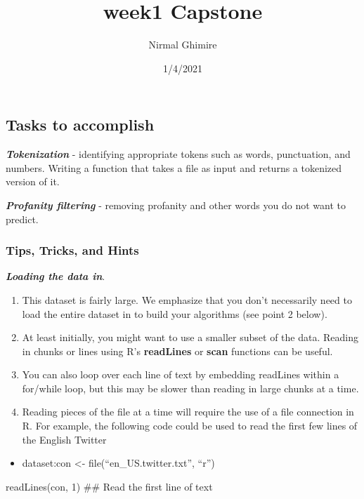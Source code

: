 \documentclass[
]{article}
\title{week1 Capstone}
\author{Nirmal Ghimire}
\date{1/4/2021}
\providecommand{\tightlist}{%
  \setlength{\itemsep}{0pt}\setlength{\parskip}{0pt}}
\begin{document}
\maketitle

\hypertarget{tasks-to-accomplish}{%
\subsection{Tasks to accomplish}\label{tasks-to-accomplish}}

\textbf{\emph{Tokenization }}- identifying appropriate tokens such as
words, punctuation, and numbers. Writing a function that takes a file as
input and returns a tokenized version of it.

\textbf{\emph{Profanity filtering}} - removing profanity and other words
you do not want to predict.

\hypertarget{tips-tricks-and-hints}{%
\subsubsection{Tips, Tricks, and Hints}\label{tips-tricks-and-hints}}

\textbf{\emph{Loading the data in}}.

\begin{enumerate}
\def\labelenumi{\alph{enumi}.}
\tightlist
\item
  This dataset is fairly large. We emphasize that you don't necessarily
  need to load the entire dataset in to build your algorithms (see point
  2 below).
\item
  At least initially, you might want to use a smaller subset of the
  data. Reading in chunks or lines using R's \textbf{readLines} or
  \textbf{scan} functions can be useful.
\item
  You can also loop over each line of text by embedding readLines within
  a for/while loop, but this may be slower than reading in large chunks
  at a time.
\item
  Reading pieces of the file at a time will require the use of a file
  connection in R. For example, the following code could be used to read
  the first few lines of the English Twitter
\end{enumerate}

\begin{itemize}
\tightlist
\item
  dataset:con \textless- file(``en\_US.twitter.txt'', ``r'')
\end{itemize}

readLines(con, 1) \#\# Read the first line of text
\end{document}

